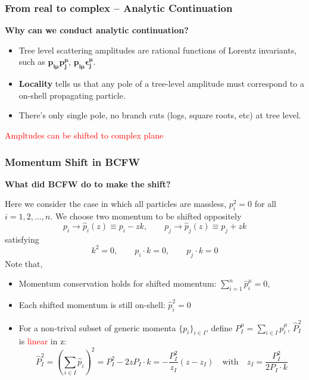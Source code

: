 \documentclass{beamer}
\begin{document}
\begin{frame}
    \frametitle{From real to complex -- Analytic Continuation}
    \textbf{Why can we conduct analytic continuation?}
\begin{itemize}
  \item Tree level scattering amplitudes are rational functions of Lorentz invariants, such as $\bm{p_{i\mu}p_j^\mu}$, $\bm{p_{i\mu}\epsilon_j^\mu}$.
  \item \textbf{Locality} tells us that any pole of a tree-level amplitude must correspond to a on-shell propagating particle. 
  \item There's only single pole, no branch cuts (logs, square roots, etc) at tree level.
\end{itemize}
    \begin{center}
    \end{center}
\vspace{0.5em}
\centering
\textcolor{red}{Ampltudes can be shifted to complex plane}
\end{frame}

\begin{frame}
    \frametitle{Momentum Shift in BCFW}
    \textbf{What did BCFW do to make the shift?}


    Here we consider the case in which all particles are massless, $p_i^2 = 0$ for all $i = 1, 2, \dotsc, n$. We choose two momentum to be shifted oppositely 
    \begin{equation*}
        p_i\rightarrow\hat{p}_i(z)\equiv p_i-zk,\qquad p_j\rightarrow\hat{p}_j(z)\equiv p_j+zk
    \end{equation*}
    satisfying 
    \begin{equation*}
        k^2=0,\qquad p_i\cdot k=0,\qquad p_j\cdot k=0
    \end{equation*}
    Note that,
    \begin{itemize}
        \item Momentum conservation holds for shifted momentum: $\sum_{i=1}^{n}\hat{p}_i^\mu=0$,
        \item Each shifted momentum is still on-shell: $\hat{p}_i^2=0$
        \item For a non-trival subset of generic momenta $\{p_i\}_{i\in I}$, define $P_I^\mu=\sum_{i\in I}p_i^\mu$, $\hat{P}_I^2$ is \textcolor{red}{linear} in z:
              \begin{equation*}
                \hat{P}_I^2=\left(\sum_{i\in I} \hat{p}_i \right) ^2 = P_I^2 -2zP_I\cdot k=-\frac{P_I^2}{z_I}(z-z_I) \quad \text{with} \quad z_I=\frac{P_I^2}{2P_I\cdot k}
              \end{equation*}
    \end{itemize}

\end{frame}
\end{document}
